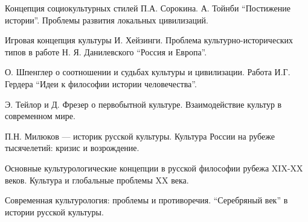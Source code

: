 \documentclass[
	14pt,
	a4paper,
	]
	{scrartcl}
\begin{document}
\shapk
{}
\setcounter{zad}{0}

\vfill
\z Концепция социокультурных стилей П.А. Сорокина.
 \vfill
\z А. Тойнби “Постижение истории”. Проблемы развития локальных цивилизаций.
 \vfill

\vfill

\newpage


\shapk
{}
\setcounter{zad}{0}

\vfill
\z Игровая концепция культуры И. Хейзинги.
 \vfill
\z Проблема культурно-исторических типов в работе Н. Я. Данилевского “Россия и Европа”.
 \vfill

\vfill

\newpage


\shapk
{}
\setcounter{zad}{0}

\vfill
\z О. Шпенглер о соотношении и судьбах культуры и цивилизации.
 \vfill
\z Работа И.Г. Гердера “Идеи к философии истории человечества”.
 \vfill

\vfill

\newpage


\shapk
{}
\setcounter{zad}{0}

\vfill
\z Э. Тейлор и Д. Фрезер о первобытной культуре.
 \vfill
\z Взаимодействие культур в современном мире.
 \vfill

\vfill

\newpage


\shapk
{}
\setcounter{zad}{0}

\vfill
\z П.Н. Милюков — историк русской культуры.
 \vfill
\z Культура России на рубеже тысячелетий: кризис и возрождение.
 \vfill

\vfill

\newpage


\shapk
{}
\setcounter{zad}{0}

\vfill
\z Основные культурологические концепции в русской философии рубежа XIX-XX веков.
 \vfill
\z Культура и глобальные проблемы XX века.
 \vfill

\vfill

\newpage


\shapk
{}
\setcounter{zad}{0}

\vfill
\z Современная культурология: проблемы и противоречия.
 \vfill
\z “Серебряный век” в истории русской культуры.
 \vfill

\vfill

\newpage
\end{document}
